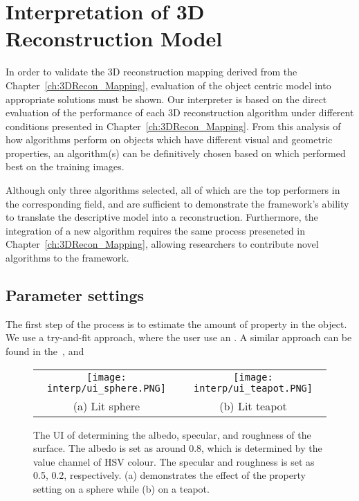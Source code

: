 
\chapter{Interpretation of 3D Reconstruction Model}
\label{ch:3DRecon_Interp}
In order to validate the 3D reconstruction mapping derived from the Chapter~\ref{ch:3DRecon_Mapping}, evaluation of the object centric model into appropriate solutions must be shown. Our interpreter is based on the direct evaluation of the performance of each 3D reconstruction algorithm under different conditions presented in Chapter~\ref{ch:3DRecon_Mapping}. From this analysis of how algorithms perform on objects which have different visual and geometric properties, an algorithm(s) can be definitively chosen based on which performed best on the training images.


Although only three algorithms selected, all of which are the top performers in the corresponding field, and are sufficient to demonstrate the framework's ability to translate the descriptive model into a reconstruction. Furthermore, the integration of a new algorithm requires the same process preseneted in Chapter~\ref{ch:3DRecon_Mapping}, allowing researchers to contribute novel algorithms to the framework.

\section{Parameter settings}
The first step of the process is to estimate the amount of property in the object. We use a try-and-fit approach, where the user use an . A similar approach can be found in the~\cite{Berkiten:2016:ARB}, and 

\begin{figure}[h!]
\centering
\begin{tabular}{cc}
  \texttt{[image: interp/ui\_sphere.PNG]}&
  \texttt{[image: interp/ui\_teapot.PNG]}\\
  (a) Lit sphere & (b) Lit teapot\\
\end{tabular}
\caption{The UI of determining the albedo, specular, and roughness of the surface. The albedo is set as around 0.8, which is determined by the value channel of HSV colour. The specular and roughness is set as 0.5, 0.2, respectively. (a) demonstrates the effect of the property setting on a sphere while (b) on a teapot.}
\label{fig:ui}
\end{figure}

